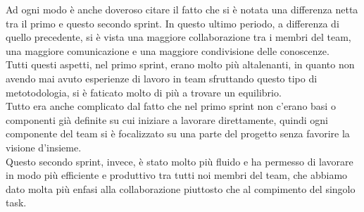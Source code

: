 \documentclass{article}
\begin{document}
Ad ogni modo è anche doveroso citare il fatto che si è notata una differenza netta tra il primo e questo secondo sprint. In questo ultimo periodo, a differenza di quello precedente, si è vista una maggiore collaborazione tra i membri del team, una maggiore comunicazione e una maggiore condivisione delle conoscenze.\\
Tutti questi aspetti, nel primo sprint, erano molto più altalenanti, in quanto non avendo mai avuto esperienze di lavoro in team sfruttando questo tipo di metotodologia, si è faticato molto di più a trovare un equilibrio.\\
Tutto era anche complicato dal fatto che nel primo sprint non c'erano basi o componenti già definite su cui iniziare a lavorare direttamente, quindi ogni componente del team si è focalizzato su una parte del progetto senza favorire la visione d'insieme.\\
Questo secondo sprint, invece, è stato molto più fluido e ha permesso di lavorare in modo più efficiente e produttivo tra tutti noi membri del team, che abbiamo dato molta più enfasi alla collaborazione piuttosto che al compimento del singolo task.\\
\end{document}
